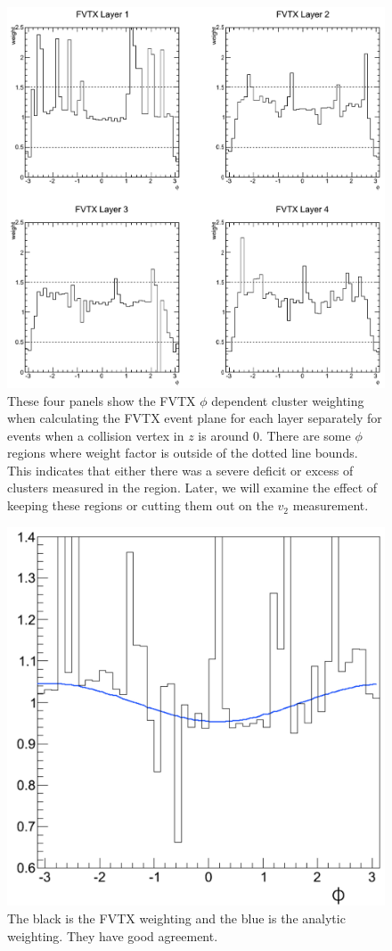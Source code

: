 \begin{figure}[!ht]
\centering
\includegraphics[width=0.75\linewidth]{figs/fvtx_weighting.png}
\caption{These four panels show the FVTX $\phi$ dependent cluster weighting when calculating the FVTX event plane for each layer separately for events when a collision vertex in $z$ is around 0. There are some $\phi$ regions where weight factor is outside of the dotted line bounds. This indicates that either there was a severe deficit or excess of clusters measured in the region. Later, we will examine the effect of keeping these regions or cutting them out on the $v_2$ measurement.}
\label{fig:fvtx_weighting}
\end{figure}
\begin{figure}[!ht]
\centering
\includegraphics[width=0.5\linewidth]{figs/comparison_of_weights.png}
\caption{The black is the FVTX weighting and the blue is the analytic weighting. They have good agreement.}
\label{fig:analytic_comparison}
\end{figure}

